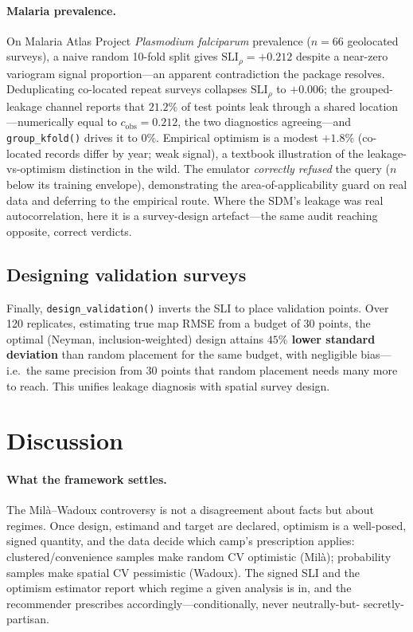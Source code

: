 \documentclass[11pt,a4paper]{article}
\newcommand{\SLI}{\mathrm{SLI}}
\newcommand{\SLIrho}{\SLI_{\rho}}
\begin{document}
\paragraph{Malaria prevalence.} On Malaria Atlas Project \emph{Plasmodium falciparum}
prevalence \citep{weiss2019mapping} ($n=66$ geolocated surveys), a naive random
10-fold split gives $\SLIrho=+0.212$ despite a near-zero variogram signal
proportion---an apparent contradiction the package resolves. Deduplicating co-located
repeat surveys collapses $\SLIrho$ to $+0.006$; the grouped-leakage channel reports
that \textbf{$21.2\%$} of test points leak through a shared location---numerically
equal to $c_{\text{obs}}=0.212$, the two diagnostics agreeing---and
\texttt{group\_kfold()} drives it to $0\%$. Empirical optimism is a modest $+1.8\%$
(co-located records differ by year; weak signal), a textbook illustration of the
leakage-vs-optimism distinction in the wild. The emulator \emph{correctly refused} the
query ($n$ below its training envelope), demonstrating the area-of-applicability guard
on real data and deferring to the empirical route. Where the SDM's leakage was real
autocorrelation, here it is a survey-design artefact---the same audit reaching
opposite, correct verdicts.

\subsection{Designing validation surveys}\label{sec:res-design}

Finally, \texttt{design\_validation()} inverts the SLI to place validation points.
Over 120 replicates, estimating true map RMSE from a budget of 30 points, the
optimal (Neyman, inclusion-weighted) design attains \textbf{$45\%$ lower standard
deviation} than random placement for the same budget, with negligible bias---i.e.\
the same precision from 30 points that random placement needs many more to reach.
This unifies leakage diagnosis with spatial survey design.

\section{Discussion}\label{sec:discussion}

\paragraph{What the framework settles.} The Mil\`a--Wadoux controversy is not a
disagreement about facts but about regimes. Once design, estimand and target are
declared, optimism is a well-posed, signed quantity, and the data decide which
camp's prescription applies: clustered/convenience samples make random CV
optimistic (Mil\`a); probability samples make spatial CV pessimistic (Wadoux). The
signed SLI and the optimism estimator report which regime a given analysis is in,
and the recommender prescribes accordingly---conditionally, never neutrally-but-
secretly-partisan.
\end{document}
